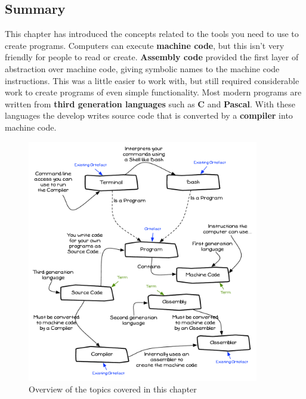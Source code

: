 \clearpage
\subsection{Summary} %
\label{sub:compilers_summary}

This chapter has introduced the concepts related to the tools you need to use to create programs. Computers can execute \textbf{machine code}, but this isn't very friendly for people to read or create. \textbf{Assembly code} provided the first layer of abstraction over machine code, giving symbolic names to the machine code instructions. This was a little easier to work with, but still required considerable work to create programs of even simple functionality. Most modern programs are written from \textbf{third generation languages} such as \textbf{C} and \textbf{Pascal}. With these languages the develop writes source code that is converted by a \textbf{compiler} into machine code.

\begin{figure}[h]
   \centering
   \includegraphics[width=0.9\textwidth]{./topics/programs-and-compilers/diagrams/Summary} 
   \caption{Overview of the topics covered in this chapter}
   \label{fig:compilers_summary}
\end{figure}


